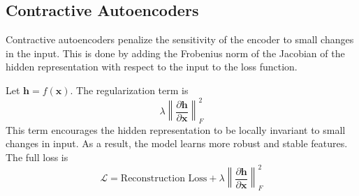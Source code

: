 \subsection{Contractive Autoencoders}

Contractive autoencoders penalize the sensitivity of the encoder to small changes in the input. This is done by adding the Frobenius norm of the Jacobian of the hidden representation with respect to the input to the loss function.

Let \( \mathbf{h} = f(\mathbf{x}) \). The regularization term is
\[
\lambda \left\| \frac{\partial \mathbf{h}}{\partial \mathbf{x}} \right\|_F^2
\]
This term encourages the hidden representation to be locally invariant to small changes in input. As a result, the model learns more robust and stable features. The full loss is
\[
\mathcal{L} = \text{Reconstruction Loss} + \lambda \left\| \frac{\partial \mathbf{h}}{\partial \mathbf{x}} \right\|_F^2
\]
